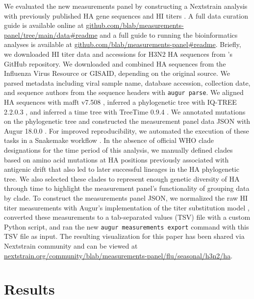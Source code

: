 \documentclass[utf8]{FrontiersinHarvard} %
\begin{document}
We evaluated the new measurements panel by constructing a Nextstrain analysis \citep{Hadfield2018} with previously published HA gene sequences and HI titers \citep{Bedford:2014bf}.
A full data curation guide is available online at \href{https://github.com/blab/measurements-panel/tree/main/data#readme}{github.com/blab/measurements-panel/tree/main/data\#readme} and a full guide to running the bioinformatics analyses is available at \href{https://github.com/blab/measurements-panel#readme}{github.com/blab/measurements-panel\#readme}.
Briefly, we downloaded HI titer data and accessions for H3N2 HA sequences from \cite{Bedford:2014bf}'s GitHub repository.
We downloaded and combined HA sequences from the Influenza Virus Resource or GISAID, depending on the original source.
We parsed metadata including viral sample name, database accession, collection date, and sequence authors from the sequence headers with \texttt{augur parse}.
We aligned HA sequences with mafft v7.508 \citep{Katoh2013}, inferred a phylogenetic tree with IQ-TREE 2.2.0.3 \citep{Minh2020}, and inferred a time tree with TreeTime 0.9.4 \citep{Sagulenko2018}.
We annotated mutations on the phylogenetic tree and constructed the measurement panel data JSON with Augur 18.0.0 \citep{Huddleston2021}.
For improved reproducibility, we automated the execution of these tasks in a Snakemake workflow \citep{Molder2021}.
In the absence of official WHO clade designations for the time period of this analysis, we manually defined clades based on amino acid mutations at HA positions previously associated with antigenic drift \citep{Wolf:2006da} that also led to later successful lineages in the HA phylogenetic tree.
We also selected these clades to represent enough genetic diversity of HA through time to highlight the measurement panel's functionality of grouping data by clade.
To construct the measurements panel JSON, we normalized the raw HI titer measurements with Augur's implementation of the titer substitution model \citep{Neher:2016hy}, converted these measurements to a tab-separated values (TSV) file with a custom Python script, and ran the new \texttt{augur measurements export} command with this TSV file as input.
The resulting visualization for this paper has been shared via Nextstrain community and can be viewed at \href{https://nextstrain.org/community/blab/measurements-panel/flu/seasonal/h3n2/ha}{nextstrain.org/community/blab/measurements-panel/flu/seasonal/h3n2/ha}.

\section{Results}
\end{document}
